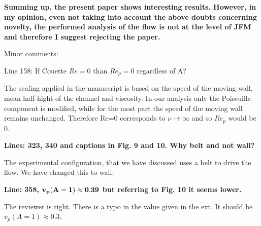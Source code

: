 \documentclass[a4paper,12pt]{article}
\begin{document}
{\bf Summing up, the present paper shows interesting results. However, in my opinion, even not taking into account the above doubts concerning novelty, the performed analysis of the flow is not at the level of JFM and therefore I suggest rejecting the paper. 

Minor comments: 

Line 158: If Couette $Re=0$ than $Re_p=0$ regardless of A?}

\vspace*{20pt}
The scaling applied in the manuscript is based on the speed of the moving wall, mean half-hight of the channel and viscosity.  In our analysis only the Poiseuille component is modified, while for the most part the speed of the moving wall remains unchanged. Therefore Re=0 corresponds to $\nu\to\infty$ and so $Re_p$ would be $0$. 
\vspace*{20pt}

{\bf Lines: 323, 340 and captions in Fig. 9 and 10. Why belt and not wall?}

\vspace*{20pt}
The experimental configuration, that we have discussed uses a belt to drive the flow. We have changed this to wall. 
\vspace*{20pt}

{\bf Line: 358, $\bf v_p(A=1) \approx 0.39$ but referring to Fig. 10 it seems lower.}

\vspace*{20pt}
The reviewer is right. There is a typo in the value given in the ext. It should be $v_p(A=1) \approx 0.3$. 
\vspace*{20pt}
\end{document}
